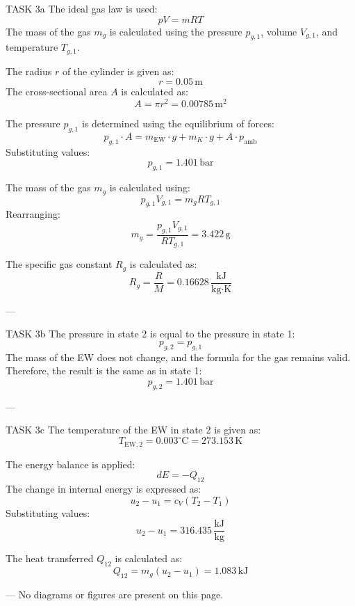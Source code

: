 TASK 3a  
The ideal gas law is used:  
\[
p V = m R T
\]  
The mass of the gas \( m_g \) is calculated using the pressure \( p_{g,1} \), volume \( V_{g,1} \), and temperature \( T_{g,1} \).  

The radius \( r \) of the cylinder is given as:  
\[
r = 0.05 \, \text{m}
\]  
The cross-sectional area \( A \) is calculated as:  
\[
A = \pi r^2 = 0.00785 \, \text{m}^2
\]  

The pressure \( p_{g,1} \) is determined using the equilibrium of forces:  
\[
p_{g,1} \cdot A = m_{\text{EW}} \cdot g + m_K \cdot g + A \cdot p_{\text{amb}}
\]  
Substituting values:  
\[
p_{g,1} = 1.401 \, \text{bar}
\]  

The mass of the gas \( m_g \) is calculated using:  
\[
p_{g,1} V_{g,1} = m_g R T_{g,1}
\]  
Rearranging:  
\[
m_g = \frac{p_{g,1} V_{g,1}}{R T_{g,1}} = 3.422 \, \text{g}
\]  

The specific gas constant \( R_g \) is calculated as:  
\[
R_g = \frac{R}{M} = 0.16628 \, \frac{\text{kJ}}{\text{kg·K}}
\]  

---

TASK 3b  
The pressure in state 2 is equal to the pressure in state 1:  
\[
p_{g,2} = p_{g,1}
\]  
The mass of the EW does not change, and the formula for the gas remains valid. Therefore, the result is the same as in state 1:  
\[
p_{g,2} = 1.401 \, \text{bar}
\]  

---

TASK 3c  
The temperature of the EW in state 2 is given as:  
\[
T_{\text{EW},2} = 0.003^\circ\text{C} = 273.153 \, \text{K}
\]  

The energy balance is applied:  
\[
dE = -Q_{12}
\]  
The change in internal energy is expressed as:  
\[
u_2 - u_1 = c_V (T_2 - T_1)
\]  
Substituting values:  
\[
u_2 - u_1 = 316.435 \, \frac{\text{kJ}}{\text{kg}}
\]  

The heat transferred \( Q_{12} \) is calculated as:  
\[
Q_{12} = m_g (u_2 - u_1) = 1.083 \, \text{kJ}
\]  

---  
No diagrams or figures are present on this page.